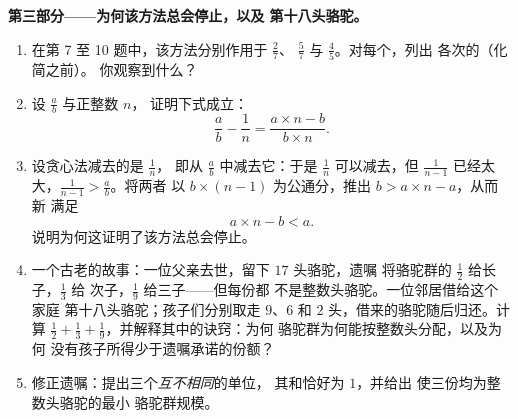 \begin{problem}
\medskip
\noindent\textbf{第三部分——为何该方法总会停止，以及
第十八头骆驼。}
\begin{enumerate}[resume]
  \item 在第 7 至 10 题中，该方法分别作用于 $\frac27$、
        $\frac57$ 与 $\frac45$。对每个，列出
        各次的（化简之前）。
        你观察到什么？
  \item 设 $\frac ab$ 与正整数 $n$，
        证明下式成立：
        \[
        \frac{a}{b} - \frac{1}{n}
        = \frac{a \times n - b}{b \times n} .
        \]
  \item 设贪心法减去的是 $\frac1n$，
        即从 $\frac ab$ 中减去它：于是 $\frac1n$ 可以减去，但 $\frac{1}{n-1}$
        已经太大，$\frac{1}{n-1} > \frac ab$。将两者
        以 $b \times (n - 1)$ 为公通分，推出
        $b > a \times n - a$，从而新
        满足
        \[
        a \times n - b < a .
        \]
        说明为何这证明了该方法总会停止。
  \item 一个古老的故事：一位父亲去世，留下 $17$ 头骆驼，遗嘱
        将骆驼群的 $\frac12$ 给长子，$\frac13$ 给
        次子，$\frac19$ 给三子——但每份都
        不是整数头骆驼。一位邻居借给这个家庭
        第十八头骆驼；孩子们分别取走 $9$、$6$ 和
        $2$ 头，借来的骆驼随后归还。计算
        $\frac12 + \frac13 + \frac19$，并解释其中的诀窍：为何
        骆驼群为何能按整数头分配，以及为何
        没有孩子所得少于遗嘱承诺的份额？
  \item 修正遗嘱：提出三个\emph{互不相同}的单位，
        其和恰好为 $1$，并给出
        使三份均为整数头骆驼的最小
        骆驼群规模。
\end{enumerate}
\end{problem}
